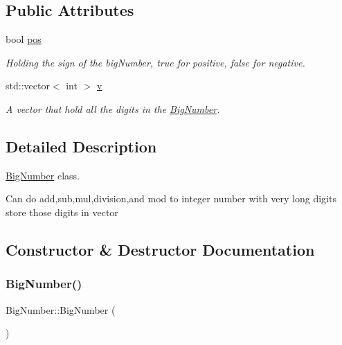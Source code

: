 \subsection*{Public Attributes}
\begin{DoxyCompactItemize}
\item 
\mbox{\label{class_big_number_a06d1806f79449a0391ac85cdfccfecb5}} 
bool \mbox{\hyperlink{class_big_number_a06d1806f79449a0391ac85cdfccfecb5}{pos}}
\begin{DoxyCompactList}\small\item\em Holding the sign of the big\+Number, true for positive, false for negative. \end{DoxyCompactList}\item 
\mbox{\label{class_big_number_a5282fab9ba2b2f2fdfef0036421e247e}} 
std\+::vector$<$ int $>$ \mbox{\hyperlink{class_big_number_a5282fab9ba2b2f2fdfef0036421e247e}{v}}
\begin{DoxyCompactList}\small\item\em A vector that hold all the digits in the \mbox{\hyperlink{class_big_number}{Big\+Number}}. \end{DoxyCompactList}\end{DoxyCompactItemize}


\subsection{Detailed Description}
\mbox{\hyperlink{class_big_number}{Big\+Number}} class. 

Can do add,sub,mul,division,and mod to integer number with very long digits store those digits in vector 

\subsection{Constructor \& Destructor Documentation}
\mbox{\label{class_big_number_a0d12fbec476322042ba36e61e1b0db82}} 
\subsubsection{\texorpdfstring{BigNumber()}{BigNumber()}\hspace{0.1cm}{\footnotesize\ttfamily [1/2]}}
{\footnotesize\ttfamily Big\+Number\+::\+Big\+Number (\begin{DoxyParamCaption}{ }\end{DoxyParamCaption})}



